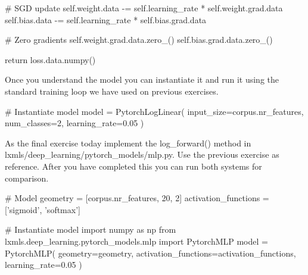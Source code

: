 \begin{exercise}
\begin{python}
		# SGD update
		self.weight.data -= self.learning_rate * self.weight.grad.data
		self.bias.data -= self.learning_rate * self.bias.grad.data

		# Zero gradients
		self.weight.grad.data.zero_()
		self.bias.grad.data.zero_()

		return loss.data.numpy()
\end{python}
Once you understand the model you can instantiate it and run it using the standard training loop we have used on previous exercises.
\begin{python}
# Instantiate model
model = PytorchLogLinear(
    input_size=corpus.nr_features,
    num_classes=2,
    learning_rate=0.05
)
\end{python}
\end{exercise}

\begin{exercise}
As the final exercise today implement the log\_forward() method in lxmls/deep\_learning/pytorch\_models/mlp.py. Use the previous exercise as reference. After you have completed this you can run both systems for comparison. 
\begin{python}
# Model
geometry = [corpus.nr_features, 20, 2]
activation_functions = ['sigmoid', 'softmax']

# Instantiate model
import numpy as np
from lxmls.deep_learning.pytorch_models.mlp import PytorchMLP
model = PytorchMLP(
    geometry=geometry,
    activation_functions=activation_functions,
    learning_rate=0.05
)
\end{python}
\end{exercise}
